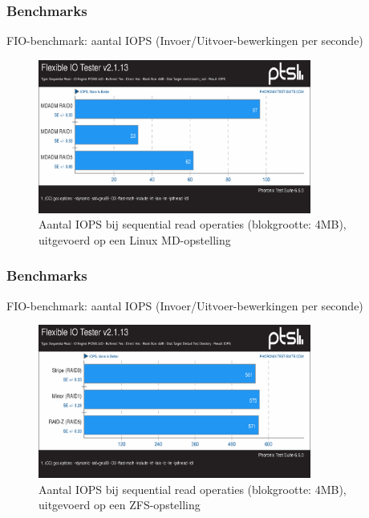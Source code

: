 \documentclass{beamer}
\begin{document}

\begin{frame}
  \frametitle{Benchmarks}
  FIO-benchmark: aantal IOPS (Invoer/Uitvoer-bewerkingen per seconde)    
  \begin{figure}
    \centering
    \includegraphics[width=0.8\textwidth]{img/Testen/FIO-4MB/fio-seqread-4mb-md}
    \caption{Aantal IOPS bij sequential read operaties (blokgrootte: 4MB), uitgevoerd op een Linux MD-opstelling}
  \end{figure}
\end{frame}


\begin{frame}
  \frametitle{Benchmarks}
  FIO-benchmark: aantal IOPS (Invoer/Uitvoer-bewerkingen per seconde)    
  \begin{figure}
    \centering
    \includegraphics[width=0.8\textwidth]{img/Testen/FIO-4MB/fio-seqread-4mb-zfs}
    \caption{Aantal IOPS bij sequential read operaties (blokgrootte: 4MB), uitgevoerd op een ZFS-opstelling}
  \end{figure}
\end{frame}

\end{document}

